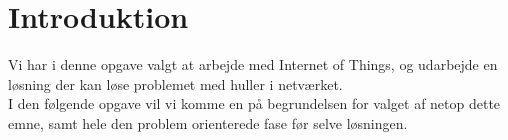 



\chapter{Introduktion}
    Vi har i denne opgave valgt at arbejde med Internet of Things, og udarbejde en løsning der kan løse problemet med huller i netværket.\\
    I den følgende opgave vil vi komme en på begrundelsen for valget af netop dette emne, samt hele den problem orienterede fase før selve løsningen.



\newpage